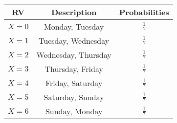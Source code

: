 
\begin{center}
\begin{tabular}{|c|c|c|}
\hline
\textbf{RV} & \textbf{Description} & \textbf{Probabilities}\\ \hline
$X = 0$	    &   Monday, Tuesday & $\frac{1}{7}$\\ \hline
$X = 1$	    &   Tuesday, Wednesday & $\frac{1}{7}$\\ \hline
$X = 2$	    &   Wednesday, Thursday & $\frac{1}{7}$\\ \hline
$X = 3$	    &   Thursday, Friday & $\frac{1}{7}$\\ \hline
$X = 4$	    &   Friday, Saturday & $\frac{1}{7}$\\ \hline
$X = 5$	    &   Saturday, Sunday & $\frac{1}{7}$\\ \hline
$X = 6$	    &   Sunday, Monday & $\frac{1}{7}$\\ \hline
\end{tabular}
\end{center}
